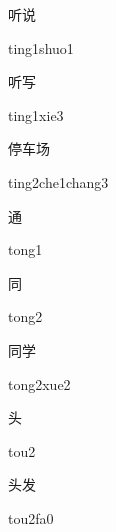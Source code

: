 \begin{verbete}{听说}
\begin{pronuncia}{ting1shuo1}
\end{pronuncia}
\end{verbete}

\begin{verbete}{听写}
\begin{pronuncia}{ting1xie3}
\end{pronuncia}
\end{verbete}

\begin{verbete}{停车场}
\begin{pronuncia}{ting2che1chang3}
\end{pronuncia}
\end{verbete}

\begin{verbete}[tong1]{通}
\begin{pronuncia}{tong1}
\end{pronuncia}
\end{verbete}

\begin{verbete}[tong2]{同}
\begin{pronuncia}{tong2}
\end{pronuncia}
\end{verbete}

\begin{verbete}{同学}
\begin{pronuncia}{tong2xue2}
\end{pronuncia}
\end{verbete}

\begin{verbete}[tou2]{头}
\begin{pronuncia}{tou2}
\end{pronuncia}
\end{verbete}

\begin{verbete}[tou2fa0]{头发}
\begin{pronuncia}{tou2fa0}
\end{pronuncia}
\end{verbete}

